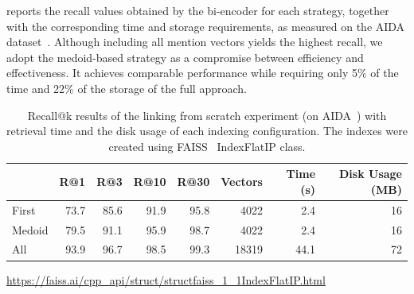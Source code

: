  reports the recall values obtained by the bi-encoder for each strategy, together with the corresponding time and storage requirements, as measured on the AIDA dataset~\cite{aida}.
Although including all mention vectors yields the highest recall, we adopt the medoid-based strategy as a compromise between efficiency and effectiveness. It achieves comparable performance while requiring only 5\% of the time and 22\% of the storage of the full approach.
\begin{table}[!htbp]
\centering
\begin{threeparttable}
    \caption{Recall@k results of the linking from scratch experiment (on AIDA~\cite{aida}) with retrieval time and the disk usage of each indexing configuration. The indexes were created using FAISS~\cite{faiss} IndexFlatIP class.}
    \label{tab:new_entities_recall}
    \begin{tabular}{l|rrrr|rrr}
        \toprule
         & \textbf{R@1} & \textbf{R@3} & \textbf{R@10} & \textbf{R@30} & \textbf{Vectors} & \textbf{Time (s)} & \textbf{Disk Usage (MB)} \\
         \midrule
         First  & 73.7 & 85.6 & 91.9 & 95.8 &  4022 &  2.4 & 16\\
         Medoid & 79.5 & 91.1 & 95.9 & 98.7 &  4022 &  2.4 & 16\\
         All    & 93.9 & 96.7 & 98.5 & 99.3 &  18319 &  44.1 & 72 \\
        \bottomrule
    \end{tabular}
    \begin{tablenotes}
        \footnotesize
        \item[1] \url{https://faiss.ai/cpp_api/struct/structfaiss_1_1IndexFlatIP.html}
    \end{tablenotes}
\end{threeparttable}
\end{table}




